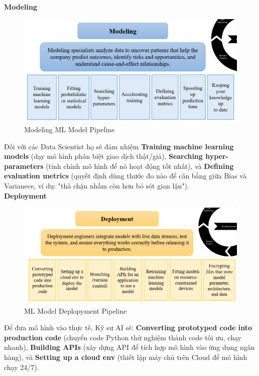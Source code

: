 \documentclass[11pt]{article}
\begin{document}
\noindent \textbf{Modeling}
\begin{figure}[H]
    \centering
    \includegraphics[width=0.8\linewidth]{images/modeling.png}
    \caption{Modeling ML Model Pipeline}
\end{figure}
Đối với các Data Scientist họ sẽ đảm nhiệm \textbf{Training machine learning models} (dạy mô hình phân biệt giao dịch thật/giả), \textbf{Searching hyper-parameters} (tinh chỉnh mô hình để nó hoạt động tốt nhất), và \textbf{Defining evaluation metrics} (quyết định dùng thước đo nào để cân bằng giữa Bias và Varianece, ví dụ: "thà chặn nhầm còn hơn bỏ sót gian lận"). \\

\noindent \textbf{Deployment}
\begin{figure}[H]
    \centering
    \includegraphics[width=0.8\linewidth]{images/deployment.png}
    \caption{ML Model Deplopyment Pipeline}
\end{figure}
Để đưa mô hình vào thực tế, Kỹ sư AI sẽ: \textbf{Converting prototyped code into production code} (chuyển code Python thử nghiệm thành code tối ưu, chạy nhanh), \textbf{Building APIs} (xây dựng API để tích hợp mô hình vào ứng dụng ngân hàng), và \textbf{Setting up a cloud env} (thiết lập máy chủ trên Cloud để mô hình chạy 24/7). \\
\end{document}
